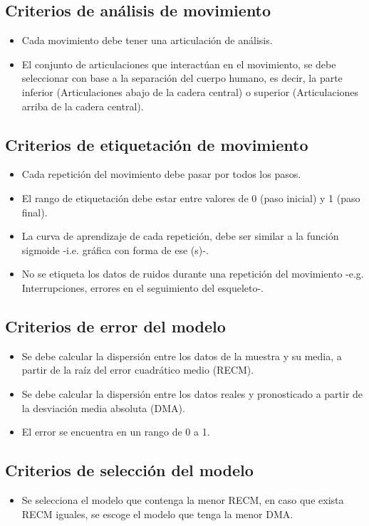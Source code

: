 \subsection{Criterios de an\'alisis de movimiento}
\begin{itemize}
	\item Cada movimiento debe tener una articulaci\'on de an\'alisis.
	\item El conjunto de articulaciones que interact\'uan en el movimiento, se debe seleccionar con base a la separaci\'on del cuerpo humano, es decir, la parte inferior (Articulaciones abajo de la cadera central) o superior (Articulaciones arriba de la cadera central).
\end{itemize}
\subsection{Criterios de etiquetaci\'on de movimiento}
\begin{itemize}
	\item Cada repetici\'on del movimiento debe pasar por todos los pasos.
	\item El rango de etiquetaci\'on debe estar entre valores de 0 (paso inicial) y 1 (paso final).
	\item La curva de aprendizaje de cada repetici\'on, debe ser similar a la funci\'on sigmoide -i.e. gr\'afica con forma de ese (s)-.
	\item No se etiqueta los datos de ruidos durante una repetici\'on del movimiento -e.g. Interrupciones, errores en el seguimiento del esqueleto-.
\end{itemize}
\subsection{Criterios de error del modelo}
\begin{itemize}
	\item Se debe calcular la dispersi\'on entre los datos de la muestra y su media, a partir de la ra\'iz del error cuadr\'atico medio (RECM).
	\item Se debe calcular la dispersi\'on entre los datos reales y pronosticado a partir de la desviaci\'on media absoluta (DMA). 
	\item El error se encuentra en un rango de 0 a 1.
\end{itemize}
\subsection{Criterios de selecci\'on del modelo}
\begin{itemize}
	\item Se selecciona el modelo que contenga la  menor RECM, en caso que exista RECM iguales, se escoge el modelo que tenga la menor DMA.
\end{itemize}
